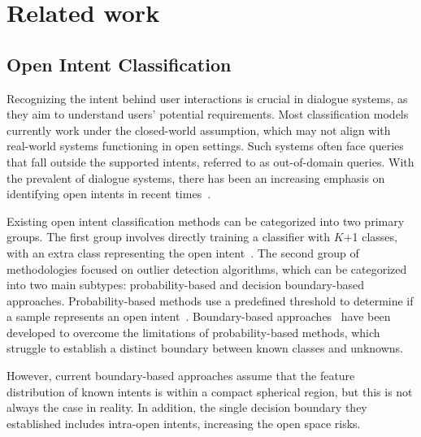 \documentclass[letterpaper]{article} %
\theoremstyle{definition}
\begin{document}
\section{Related work}\label{sec:2}

\subsection{Open Intent Classification}
Recognizing the intent behind user interactions is crucial in dialogue systems, as they aim to understand users' potential requirements. 
Most classification models currently work under the closed-world assumption, which may not align with real-world systems functioning in open settings. Such systems often face queries that fall outside the supported intents, referred to as out-of-domain queries. 
With the prevalent of dialogue systems, there has been an increasing emphasis on identifying open intents in recent times~\cite{zhou2021contrastive,zhan2021out,parmar2023open,yan2020unknown,zhang2021discovering}.

Existing open intent classification methods can be categorized into two primary groups. The first group involves directly training a classifier with $K$+1 classes, with an extra class representing the open intent~\cite{zheng2020out}. 
The second group of methodologies focused on outlier detection algorithms, which can be categorized into two main subtypes: probability-based and decision boundary-based approaches. 
Probability-based methods use a predefined threshold to determine if a sample represents an open intent~\cite{shu2017doc}.
Boundary-based approaches~\cite{zhang2021deep,liu2023effective,zhang2023learning} have been developed to overcome the limitations of probability-based methods, which struggle to establish a distinct boundary between known classes and unknowns.

However, current boundary-based approaches assume that the feature distribution of known intents is within a compact spherical region, but this is not always the case in reality. In addition, the single decision boundary they established includes intra-open intents, increasing the open space risks.
\end{document}
